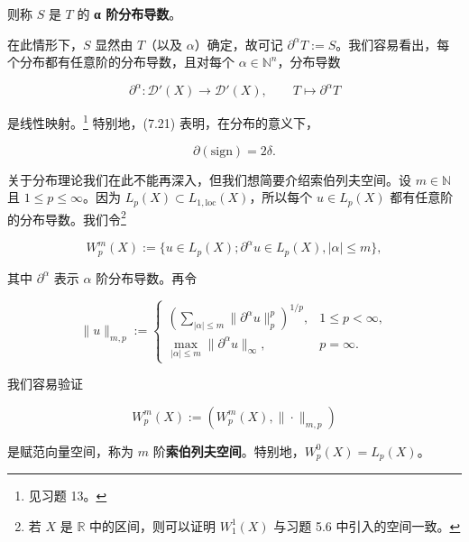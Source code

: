 \begin{remark}
则称 $ S $ 是 $ T $ 的 \textbf{α 阶分布导数}。

在此情形下，$ S $ 显然由 $ T $（以及 $ \alpha $）确定，故可记 $ \partial^{\alpha} T := S $。我们容易看出，每个分布都有任意阶的分布导数，且对每个 $ \alpha \in \mathbb{N}^n $，分布导数

\[
\partial^{\alpha} : \mathcal{D}'(X) \to \mathcal{D}'(X) , \qquad T \mapsto \partial^{\alpha} T
\]

是线性映射。\footnote{见习题 13。} 特别地，(7.21) 表明，在分布的意义下，

\[
\partial(\mathrm{sign}) = 2\delta .
\]

关于分布理论我们在此不能再深入，但我们想简要介绍索伯列夫空间。设 $ m \in \mathbb{N} $ 且 $ 1 \le p \le \infty $。因为 $ L_p(X) \subset L_{1,\mathrm{loc}}(X) $，所以每个 $ u \in L_p(X) $ 都有任意阶的分布导数。我们令\footnote{若 $ X $ 是 $ \mathbb{R} $ 中的区间，则可以证明 $ W_1^1(X) $ 与习题 5.6 中引入的空间一致。}

\[
W_p^m(X) := \{ u \in L_p(X) ; \partial^{\alpha} u \in L_p(X), |\alpha| \le m \} ,
\]

其中 $ \partial^{\alpha} $ 表示 $ \alpha $ 阶分布导数。再令

\begin{equation}
\|u\|_{m,p} := \begin{cases} \left( \sum_{|\alpha| \le m} \|\partial^{\alpha} u\|_p^p \right)^{1/p} , & 1 \le p < \infty , \\ \max_{|\alpha| \le m} \|\partial^{\alpha} u\|_\infty , & p = \infty . \end{cases}\tag{7.22}
\end{equation}

我们容易验证

\[
W_p^m(X) := (W_p^m(X), \|\cdot\|_{m,p})
\]

是赋范向量空间，称为 $ m $ 阶\textbf{索伯列夫空间}。特别地，$ W_p^0(X) = L_p(X) $。

\end{remark}

